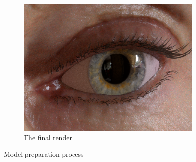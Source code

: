 \begin{figure}
\begin{subfigure}[t]{0.195\textwidth}
        \includegraphics[width=\textwidth]{process_f02_05}
        \caption{The final render}
    \end{subfigure}
    \caption{Model preparation process}
    \label{fig:process}
\end{figure}